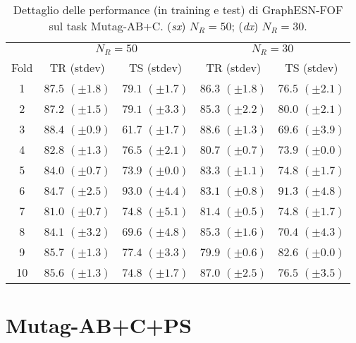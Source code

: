 \begin{table}[tbph]
\footnotesize
\caption[Dettaglio performance: GraphESN-FOF su Mutag-AB+C]{Dettaglio delle performance (in training e test) di GraphESN-FOF sul task Mutag-AB+C. (\emph{sx}) $N_R=50$; (\emph{dx}) $N_R=30$.}
\label{app:esp:Mutag-ABC-FOF}
\centering
\begin{tabular}{c*{4}{c}}
\toprule
& \multicolumn{2}{c}{$N_R=50$} & \multicolumn{2}{c}{$N_R=30$}\\
Fold & TR (stdev) & TS (stdev) & TR (stdev) & TS (stdev)\\
\midrule
1 & $87.5$ $(\pm 1.8)$ & $79.1$ $(\pm 1.7)$ & $86.3$ $(\pm 1.8)$ & $76.5$ $(\pm 2.1)$\\
2 & $87.2$ $(\pm 1.5)$ & $79.1$ $(\pm 3.3)$ & $85.3$ $(\pm 2.2)$ & $80.0$ $(\pm 2.1)$\\
3 & $88.4$ $(\pm 0.9)$ & $61.7$ $(\pm 1.7)$ & $88.6$ $(\pm 1.3)$ & $69.6$ $(\pm 3.9)$\\
4 & $82.8$ $(\pm 1.3)$ & $76.5$ $(\pm 2.1)$ & $80.7$ $(\pm 0.7)$ & $73.9$ $(\pm 0.0)$\\
5 & $84.0$ $(\pm 0.7)$ & $73.9$ $(\pm 0.0)$ & $83.3$ $(\pm 1.1)$ & $74.8$ $(\pm 1.7)$\\
6 & $84.7$ $(\pm 2.5)$ & $93.0$ $(\pm 4.4)$ & $83.1$ $(\pm 0.8)$ & $91.3$ $(\pm 4.8)$\\
7 & $81.0$ $(\pm 0.7)$ & $74.8$ $(\pm 5.1)$ & $81.4$ $(\pm 0.5)$ & $74.8$ $(\pm 1.7)$\\
8 & $84.1$ $(\pm 3.2)$ & $69.6$ $(\pm 4.8)$ & $85.3$ $(\pm 1.6)$ & $70.4$ $(\pm 4.3)$\\
9 & $85.7$ $(\pm 1.3)$ & $77.4$ $(\pm 3.3)$ & $79.9$ $(\pm 0.6)$ & $82.6$ $(\pm 0.0)$\\
10 & $85.6$ $(\pm 1.3)$ & $74.8$ $(\pm 1.7)$ & $87.0$ $(\pm 2.5)$ & $76.5$ $(\pm 3.5)$\\
\bottomrule
\end{tabular}
\end{table}




\section{Mutag-AB+C+PS}


